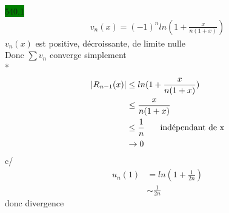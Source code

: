 \documentclass{article}
\begin{document}
\noindent \colorbox{green}{540.1}
\begin{align*}
    v_n(x) = (-1)^n ln(1+\frac{x}{n(1+x)})
\end{align*}
\(v_n(x)\) est positive, décroissante, de limite nulle \\
Donc \(\sum v_n\) converge simplement\\
* \begin{align*}
    |R_{n-1}(x)| &\leq ln(1+\frac{x}{n(1+x)})\\
    &\leq \frac{x}{n(1+x)}\\
    &\leq \frac{1}{n} \indent \text{ indépendant de x}\\
    &\rightarrow 0
\end{align*}
c/ \begin{align*}
    u_n(1) &= ln(1+\frac{1}{2n})\\
    &\sim \frac{1}{2n}
\end{align*}
donc divergence
\end{document}
